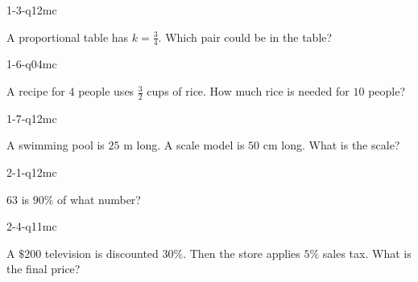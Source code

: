 
\begin{practiceQuestion}{1-3-q12}{mc}
\begin{questionText}
A proportional table has $k = \frac{3}{4}$. Which pair could be in the table?
\end{questionText}
\end{practiceQuestion}

\begin{practiceQuestion}{1-6-q04}{mc}
\begin{questionText}
A recipe for $4$ people uses $\frac{3}{2}$ cups of rice. How much rice is needed for $10$ people?
\end{questionText}
\end{practiceQuestion}

\begin{practiceQuestion}{1-7-q12}{mc}
\begin{questionText}
A swimming pool is $25$ m long. A scale model is $50$ cm long. What is the scale?
\end{questionText}
\end{practiceQuestion}

\begin{practiceQuestion}{2-1-q12}{mc}
\begin{questionText}
$63$ is $90\%$ of what number?
\end{questionText}
\end{practiceQuestion}

\begin{practiceQuestion}{2-4-q11}{mc}
\begin{questionText}
A $\$200$ television is discounted $30\%$. Then the store applies $5\%$ sales tax. What is the final price?
\end{questionText}
\end{practiceQuestion}

